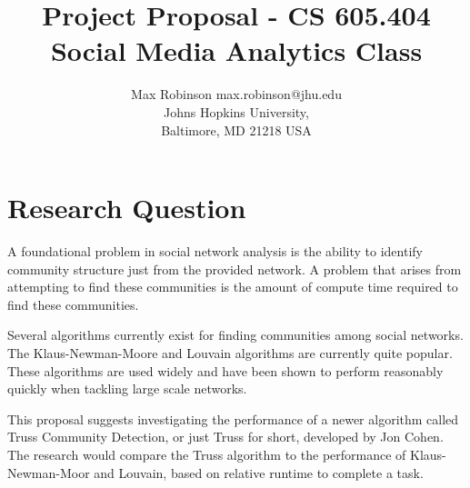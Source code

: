 \documentclass[jair,twoside,11pt,theapa]{article}
\begin{document}
\title{Project Proposal - CS 605.404 Social Media Analytics Class}


\author{\name Max Robinson \email max.robinson@jhu.edu \\
	\addr Johns Hopkins University,\\
	Baltimore, MD 21218 USA
}

\maketitle



\section{Research Question}
A foundational problem in social network analysis is the ability to identify community structure just from the provided network. A problem that arises from attempting to find these communities is the amount of compute time required to find these communities. 

Several algorithms currently exist for finding communities among social networks. The Klaus-Newman-Moore and Louvain algorithms are currently quite popular. These algorithms are used widely and have been shown to perform reasonably quickly when tackling large scale networks. 

This proposal suggests investigating the performance of a newer algorithm called Truss Community Detection, or just Truss for short, developed by Jon Cohen. The research would compare the Truss algorithm to the performance of Klaus-Newman-Moor and Louvain, based on relative runtime to complete a task. 


\end{document}
